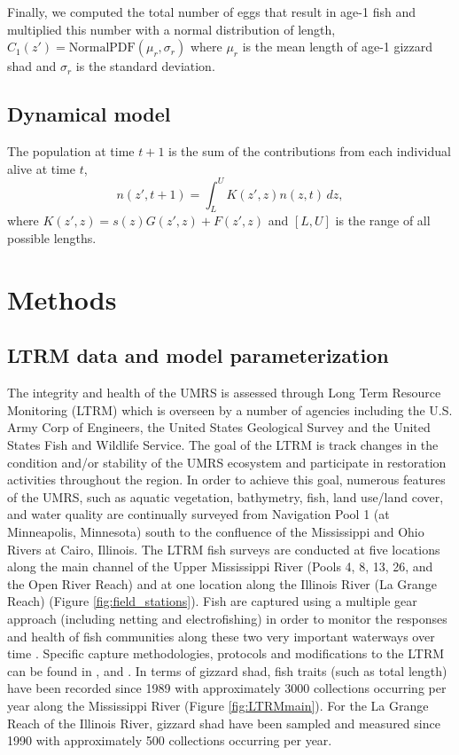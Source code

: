 \documentclass[preprint,review,12pt,authoryear]{elsarticle}
\def\ds{\displaystyle}
\begin{document}
Finally, we computed the total number of eggs that result in age-1 fish and multiplied this number with a normal distribution of length,
$ \ds C_1 (z') =  \mathrm{Normal PDF} (\mu_r, \sigma_r)$ where $\mu_r$ is the mean length of age-1 gizzard shad and $\sigma_r$ is the standard deviation. 

\subsection{Dynamical model} 
The population at time $t+1$ is the sum of the contributions from each individual alive at time $t$,
\begin{equation}\label{eq:IPM}
n(z',t+1) = \int_L^U K(z',z)n(z,t) \,dz,
\end{equation}  
where $K(z',z) = s(z) G(z',z) + F(z',z)$ and $[L,U]$ is the range of all possible lengths.

\section{Methods}
\subsection{LTRM data and model parameterization}
The integrity and health of the UMRS is assessed through Long Term Resource Monitoring (LTRM) which is overseen by a number of agencies including the U.S. Army Corp of Engineers, the United States Geological Survey and the United States Fish and Wildlife Service. 
The goal of the LTRM is track changes in the condition and/or stability of the UMRS ecosystem and participate in restoration activities throughout the region. In order to achieve this goal, numerous features of the UMRS, such as aquatic vegetation, bathymetry, fish, land use/land cover, and water quality are continually surveyed from Navigation Pool 1 (at Minneapolis, Minnesota) south to the confluence of the Mississippi and Ohio Rivers at Cairo, Illinois. 
The LTRM fish surveys are conducted at five locations along the main channel of the Upper Mississippi River (Pools 4, 8, 13, 26, and the Open River Reach) and at one location along the Illinois River (La Grange Reach) (Figure \ref{fig:field_stations}). 
Fish are captured using a multiple gear approach (including netting and electrofishing) in order to monitor the responses and health of fish communities along these two very important waterways over time \citep{gutreuter1995long}. Specific capture methodologies, protocols and modifications to the LTRM can be found in \cite{gutreuter1995long}, and \cite{ickes2002evaluation}. In terms of gizzard shad, fish traits (such as total length) have been recorded since 1989 with approximately 3000 collections occurring per year along the Mississippi River (Figure \ref{fig:LTRMmain}). For the La Grange Reach of the Illinois River, gizzard shad have been sampled and measured since 1990 with approximately 500 collections occurring per year.
\end{document}
